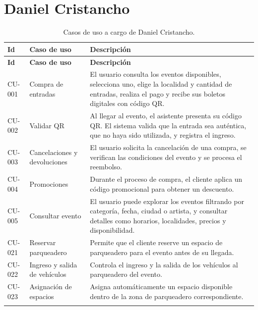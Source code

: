 \documentclass[11pt,a4paper]{article}
\begin{document}
\newpage

\section{Daniel Cristancho}

\begin{longtable}{P{1.6cm}P{4cm}P{9.4cm}}
\toprule
\textbf{Id} & \textbf{Caso de uso} & \textbf{Descripción}\\
\midrule
\endfirsthead
\toprule
\textbf{Id} & \textbf{Caso de uso} & \textbf{Descripción}\\
\midrule
\endhead

CU-001 & Compra de entradas &
El usuario consulta los eventos disponibles, selecciona uno, elige la localidad y cantidad de
entradas, realiza el pago y recibe sus boletos digitales con código QR.\\[0.5em]

CU-002 & Validar QR &
Al llegar al evento, el asistente presenta su código QR. El sistema valida que la entrada sea
auténtica, que no haya sido utilizada, y registra el ingreso.\\[0.5em]

CU-003 & Cancelaciones y devoluciones &
El usuario solicita la cancelación de una compra, se verifican las condiciones del evento y se
procesa el reembolso.\\[0.5em]

CU-004 & Promociones &
Durante el proceso de compra, el cliente aplica un código promocional para obtener un
descuento.\\[0.5em]

CU-005 & Consultar evento &
El usuario puede explorar los eventos filtrando por categoría, fecha, ciudad o artista, y
consultar detalles como horarios, localidades, precios y disponibilidad.\\[0.5em]

CU-021 & Reservar parqueadero &
Permite que el cliente reserve un espacio de parqueadero para el evento antes de su
llegada.\\[0.5em]

CU-022 & Ingreso y salida de vehículos &
Controla el ingreso y la salida de los vehículos al parqueadero del evento.\\[0.5em]

CU-023 & Asignación de espacios &
Asigna automáticamente un espacio disponible dentro de la zona de parqueadero
correspondiente.\\
\bottomrule
\caption{Casos de uso a cargo de Daniel Cristancho.}
\end{longtable}
\end{document}
